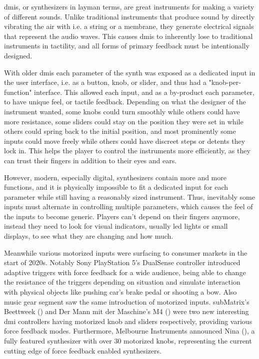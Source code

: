 \glspl{dmi}, or synthesizers in layman terms, are great instruments for making a variety of different sounds. Unlike traditional instruments that produce sound by directly vibrating the air with i.e. a string or a membrane, they generate electrical signals that represent the audio waves. This causes \glspl{dmi} to inherently lose to traditional instruments in tactility, and all forms of primary feedback must be intentionally designed.

With older \glspl{dmi} each parameter of the \gls{synth} was exposed as a dedicated input in the user interface, i.e. as a button, knob, or slider, and thus had a "knob-per-function" interface. This allowed each input, and as a by-product each parameter, to have unique feel, or tactile feedback. Depending on what the designer of the instrument wanted, some knobs could turn smoothly while others could have more resistance, some sliders could stay on the position they were set in while others could spring back to the initial position, and most prominently some inputs could move freely while others could have discreet steps or detents they lock in. This helps the player to control the instruments more efficiently, as they can trust their fingers in addition to their eyes and ears.

However, modern, especially digital, synthesizers contain more and more functions, and it is physically impossible to fit a dedicated input for each parameter while still having a reasonably sized instrument. Thus, inevitably some inputs must alternate in controlling multiple parameters, which causes the feel of the inputs to become generic. Players can't depend on their fingers anymore, instead they need to look for visual indicators, usually led lights or small displays, to see what they are changing and how much.

Meanwhile various motorized inputs were surfacing to consumer markets in the start of 2020s. Notably Sony PlayStation 5's DualSense controller introduced adaptive triggers with force feedback for a wide audience, being able to change the resistance of the triggers depending on situation and simulate interaction with physical objects like pushing car's brake pedal or shooting a bow. Also music gear segment saw the same introduction of motorized inputs. subMatrix's Beettweek (\cite{submatrix2024}) and Der Mann mit der Maschine's M4 (\cite{dmm2024}) were two new interesting \gls{dmi} controllers having motorized knob and sliders respectively, providing various force feedback modes. Furthermore, Melbourne Instruments announced Nina (\cite{melbourneinstruments2024}), a fully featured synthesizer with over 30 motorized knobs, representing the current cutting edge of force feedback enabled synthesizers.

